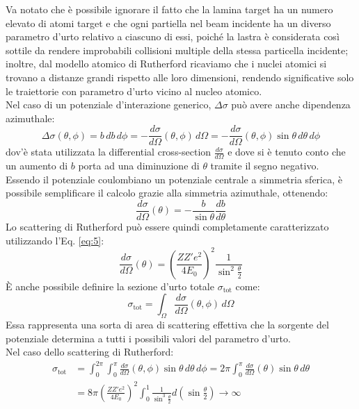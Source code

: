 Va notato che è possibile ignorare il fatto che la lamina target ha un numero elevato di atomi target e che ogni partiella nel beam incidente ha un diverso parametro d'urto relativo a ciascuno di essi, poiché la lastra è considerata così sottile da rendere improbabili collisioni multiple della stessa particella incidente; inoltre, dal modello atomico di Rutherford ricaviamo che i nuclei atomici si trovano a distanze grandi rispetto alle loro dimensioni, rendendo significative solo le traiettorie con parametro d'urto vicino al nucleo atomico.\\
Nel caso di un potenziale d'interazione generico, $ \Delta\sigma $ può avere anche dipendenza azimuthale:
\begin{equation}
	\Delta\sigma(\theta,\phi) = b \,db\,d\phi = - \frac{d\sigma}{d\Omega} (\theta,\phi) \,d\Omega= - \frac{d\sigma}{d\Omega} (\theta,\phi) \sin \theta \,d\theta\,d\phi
	\label{eq:6}
\end{equation}
dov'è stata utilizzata la differential cross-section $ \frac{d\sigma}{d\Omega} $ e dove si è tenuto conto che un aumento di $ b $ porta ad una diminuzione di $ \theta $ tramite il segno negativo.\\
Essendo il potenziale coulombiano un potenziale centrale a simmetria sferica, è possibile semplificare il calcolo grazie alla simmetria azimuthale, ottenendo:
\begin{equation}
	\frac{d\sigma}{d\Omega} (\theta) = - \frac{b}{\sin \theta} \frac{db}{d\theta}
	\label{eq:7}
\end{equation}
Lo scattering di Rutherford può essere quindi completamente caratterizzato utilizzando l'Eq. \ref{eq:5}:
\begin{equation}
	\frac{d\sigma}{d\Omega} (\theta) = \left( \frac{ZZ' e^2}{4 E_0} \right)^2 \frac{1}{\sin^2 \frac{\theta}{2}}
	\label{eq:8}
\end{equation}
È anche possibile definire la sezione d'urto totale $ \sigma_{\text{tot}} $ come:
\begin{equation}
	\sigma_{\text{tot}} = \int_{\Omega} \frac{d\sigma}{d\Omega} (\theta,\phi) \,d\Omega
	\label{eq:9}
\end{equation}
Essa rappresenta una sorta di area di scattering effettiva che la sorgente del potenziale determina a tutti i possibili valori del parametro d'urto.\\
Nel caso dello scattering di Rutherford:
\begin{equation}
	\begin{split}
		\sigma_{\text{tot}} &= \int_0^{2\pi} \int_0^{\pi} \frac{d\sigma}{d\Omega} (\theta,\phi) \sin \theta \,d\theta\,d\phi = 2\pi \int_0^{\pi} \frac{d\sigma}{d\Omega} (\theta) \sin \theta \,d\theta \\
				    &= 8\pi \left( \frac{ZZ' e^2}{4 E_0} \right)^2 \int_0^1 \frac{1}{\sin^3 \frac{\theta}{2}} d\left( \sin \frac{\theta}{2} \right) \longrightarrow \infty
	\end{split}
	\label{eq:10}
\end{equation}
